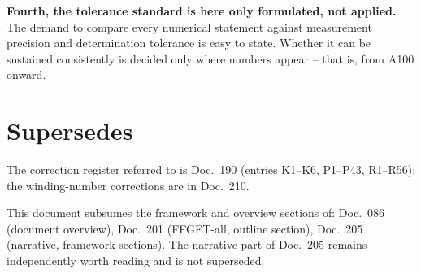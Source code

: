 \textbf{Fourth, the tolerance standard is here only formulated, not applied.}
The demand to compare every numerical statement against measurement precision
and determination tolerance is easy to state. Whether it can be sustained
consistently is decided only where numbers appear -- that is, from A100 onward.

\section{Supersedes}

The correction register referred to is Doc.~190 (entries K1--K6, P1--P43,
R1--R56); the winding-number corrections are in Doc.~210.

This document subsumes the framework and overview sections of: Doc.~086
(document overview), Doc.~201 (FFGFT-all, outline section), Doc.~205
(narrative, framework sections). The narrative part of Doc.~205 remains
independently worth reading and is not superseded.
